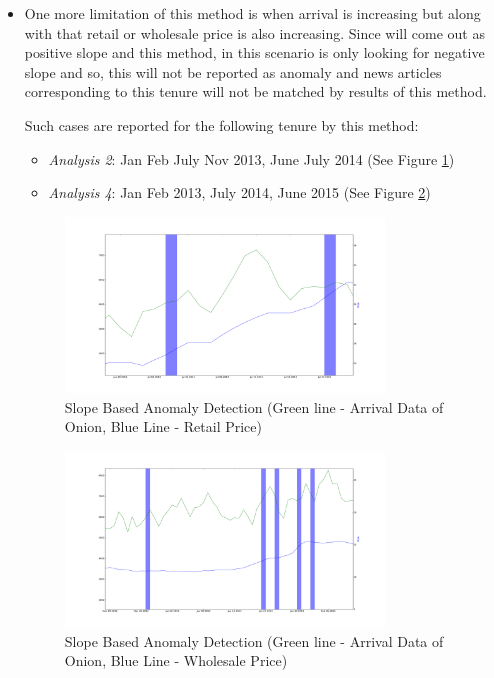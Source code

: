 \documentclass[a4paper,10pt]{report}
\begin{document}
\begin{itemize}
			\item One more limitation of this method is when arrival is increasing but along with that retail or wholesale price is also increasing. Since will come out as positive slope and this method, in this scenario is only looking for negative slope and so, this will not be reported as anomaly and news articles corresponding to this tenure will not be matched by results of this method.
			
			
			
			Such cases are reported for the following tenure by this method:
			\begin{itemize}
				\item \textit{Analysis 2}: Jan Feb July Nov 2013, June July 2014 (See Figure \ref{fig:12123})
				\item \textit{Analysis 4}: Jan Feb 2013, July 2014, June 2015 (See Figure \ref{fig:12143})
			\end{itemize}
			
			\begin{figure}[H]
		    	\centering
  		    	\includegraphics[width=0.8\textwidth]{graphs/12123.png}
		    	\caption{Slope Based Anomaly Detection (Green line - Arrival Data of Onion, Blue Line - Retail Price)}
		    	\label{fig:12123}
			\end{figure}
			
			\begin{figure}[H]
		    	\centering
  		    	\includegraphics[width=0.8\textwidth]{graphs/12143.png}
		    	\caption{Slope Based Anomaly Detection (Green line - Arrival Data of Onion, Blue Line - Wholesale Price)}
		    	\label{fig:12143}
			\end{figure}
			

\end{itemize}
\end{document}

